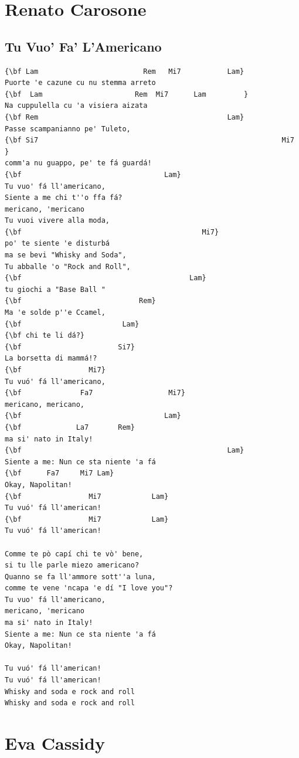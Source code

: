 \documentclass[a4paper]{article}
\begin{document}
\section{Renato Carosone}
\subsection{Tu Vuo' Fa' L'Americano}
\begin{Verbatim}[commandchars=\\\{\}]
{\bf Lam                         Rem   Mi7           Lam}
Puorte 'e cazune cu nu stemma arreto 
{\bf  Lam                      Rem  Mi7      Lam         }
Na cuppulella cu 'a visiera aizata 
{\bf Rem                                             Lam}
Passe scampanianno pe' Tuleto,
{\bf Si7                                                          Mi7                                          }
comm'a nu guappo, pe' te fá guardá! 
{\bf                                  Lam}
Tu vuo' fá ll'americano,
Siente a me chi t''o ffa fá?
mericano, 'mericano 
Tu vuoi vivere alla moda,
{\bf                                           Mi7}
po' te siente 'e disturbá 
ma se bevi "Whisky and Soda",
Tu abballe 'o "Rock and Roll",
{\bf                                        Lam}
tu giochi a "Base Ball "
{\bf                            Rem}
Ma 'e solde p''e Ccamel,
{\bf                        Lam}
{\bf chi te li dá?}
{\bf                       Si7}
La borsetta di mammá!?
{\bf                Mi7}
Tu vuó' fá ll'americano,
{\bf              Fa7                  Mi7}
mericano, mericano,
{\bf                                  Lam}
{\bf             La7       Rem}
ma si' nato in Italy!
{\bf                                                 Lam}
Siente a me: Nun ce sta niente 'a fá 
{\bf      Fa7     Mi7 Lam}
Okay, Napolitan!
{\bf                Mi7            Lam}
Tu vuó' fá ll'american!
{\bf                Mi7            Lam}
Tu vuó' fá ll'american!

Comme te pò capí chi te vò' bene,
si tu lle parle miezo americano?
Quanno se fa ll'ammore sott''a luna,
comme te vene 'ncapa 'e dí "I love you"?
Tu vuo' fá ll'americano,
mericano, 'mericano 
ma si' nato in Italy!
Siente a me: Nun ce sta niente 'a fá 
Okay, Napolitan!

Tu vuó' fá ll'american!
Tu vuó' fá ll'american!
Whisky and soda e rock and roll
Whisky and soda e rock and roll

\end{Verbatim}
\newpage
\section{Eva Cassidy}
\end{document}
